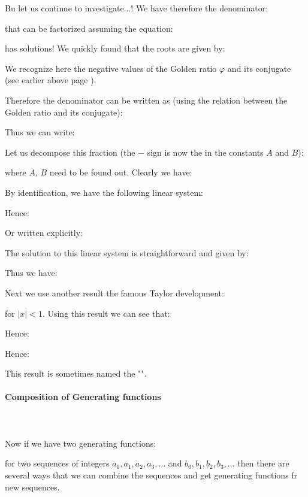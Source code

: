 	Bu let us continue to investigate...! We have therefore the denominator:
	
	that can be factorized assuming the equation:
	
	has solutions! We quickly found that the roots are given by:
	
	We recognize here the negative values of the Golden ratio $\varphi$ and its conjugate (see earlier above page \pageref{golden ratio}).
	
	Therefore the denominator can be written as (using the relation between the Golden ratio and its conjugate):
	
	Thus we can write:
	
	Let us decompose this fraction (the $-$ sign is now the in the constants $A$ and $B$):
	
	where $A$, $B$ need to be found out. Clearly we have:
	
	By identification, we have the following linear system:
	
	Hence:
	
	Or written explicitly:
	
	The solution to this linear system is straightforward and given by:
	
	Thus we have:
	
	Next we use another result the famous Taylor development:
	
	for $|x|<1$. Using this result we can see that:
	
	Hence:
	
	Hence:
	
	This result is sometimes named the "".
		
	\paragraph{Composition of Generating functions}\mbox{}\\\\
	Now if we have two generating functions:
	
	for two sequences of integers $a_0,a_1,a_2,a_3,\ldots$ and $b_0,b_1,b_2,b_3,\ldots$ then there are several ways that we can combine the sequences and get generating functions fr new sequences.

